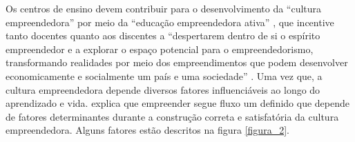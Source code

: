 






Os centros de ensino devem contribuir para o desenvolvimento da “cultura empreendedora” por meio da “educação empreendedora ativa” \cite{tscha_empreendendo_2014}, que incentive tanto docentes quanto aos discentes a “despertarem dentro de si o espírito empreendedor e a explorar o espaço potencial para o empreendedorismo, transformando realidades por meio dos empreendimentos que podem desenvolver economicamente e socialmente um país e uma sociedade” \cite{tscha_empreendendo_2014}. Uma vez que, a cultura empreendedora depende diversos fatores influenciáveis ao longo do aprendizado e vida. \cite{dornelas_empreendedorismo_2005} explica que empreender segue fluxo um definido que depende de fatores determinantes durante a construção correta e satisfatória da cultura empreendedora. Alguns fatores estão descritos na figura \ref{figura_2}.

